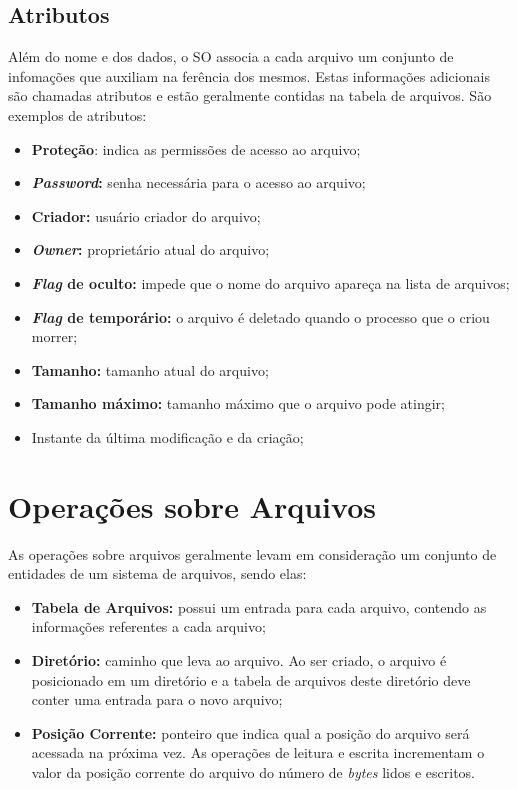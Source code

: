 \subsection{Atributos}
Além do nome e dos dados, o SO associa a cada arquivo um conjunto de infomações que auxiliam na ferência dos mesmos. Estas informações adicionais são chamadas atributos e estão geralmente contidas na tabela de arquivos. São exemplos de atributos:

\begin{itemize}
  \item \textbf{Proteção}: indica as permissões de acesso ao arquivo;
  \item \textbf{\textit{Password}:} senha necessária para o acesso ao arquivo;
  \item \textbf{Criador:} usuário criador do arquivo;
  \item \textbf{\textit{Owner}:} proprietário atual do arquivo;
  \item \textbf{\textit{Flag} de oculto:} impede que o nome do arquivo apareça na lista de arquivos;
  \item \textbf{\textit{Flag} de temporário:} o arquivo é deletado quando o processo que o criou morrer;
  \item \textbf{Tamanho:} tamanho atual do arquivo;
  \item \textbf{Tamanho máximo:} tamanho máximo que o arquivo pode atingir;
  \item Instante da última modificação e da criação;
\end{itemize}





\section{Operações sobre Arquivos}
As operações sobre arquivos geralmente levam em consideração um conjunto de entidades de um sistema de arquivos, sendo elas:

\begin{itemize}
  \item \textbf{Tabela de Arquivos:} possui um entrada para cada arquivo, contendo as informações referentes a cada arquivo;

  \item \textbf{Diretório:} caminho que leva ao arquivo. Ao ser criado, o arquivo é posicionado em um diretório e a tabela de arquivos deste diretório deve conter uma entrada para o novo arquivo;

  \item \textbf{Posição Corrente:} ponteiro que indica qual a posição do arquivo será acessada na próxima vez. As operações de leitura e escrita incrementam o valor da posição corrente do arquivo do número de \textit{bytes} lidos e escritos.
\end{itemize}


